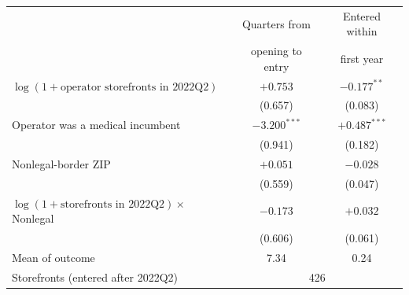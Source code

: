 \begin{tabular}{@{}lcc@{}}
\toprule
 & Quarters from & Entered within \\
 & opening to entry & first year \\
\midrule
$\log(1+\text{operator storefronts in 2022Q2})$ & $+0.753$ & $-0.177^{**}$ \\
 & (0.657) & (0.083) \\
Operator was a medical incumbent & $-3.200^{***}$ & $+0.487^{***}$ \\
 & (0.941) & (0.182) \\
Nonlegal-border ZIP & $+0.051$ & $-0.028$ \\
 & (0.559) & (0.047) \\
$\log(1+\text{storefronts in 2022Q2})\times$ Nonlegal & $-0.173$ & $+0.032$ \\
 & (0.606) & (0.061) \\
\midrule
Mean of outcome & 7.34 & 0.24 \\
Storefronts (entered after 2022Q2) & \multicolumn{2}{c}{426} \\
\bottomrule
\end{tabular}
